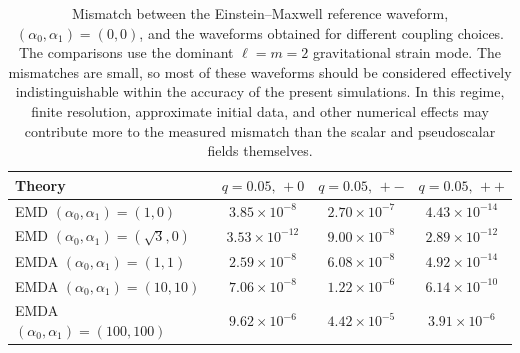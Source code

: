 \begin{table}[htbp]
\centering
\caption[EMDA interpolated mismatch table]{Mismatch between the Einstein--Maxwell reference waveform, $(\alpha_0,\alpha_1)=(0,0)$, and the waveforms obtained for different coupling choices. The comparisons use the dominant $\ell=m=2$ gravitational strain mode. The mismatches are small, so most of these waveforms should be considered effectively indistinguishable within the accuracy of the present simulations. In this regime, finite resolution, approximate initial data, and other numerical effects may contribute more to the measured mismatch than the scalar and pseudoscalar fields themselves.}
\label{tab:emda_coupling_mismatches}

\begin{tabular}{lccc}
\hline
Theory & $q=0.05,\,+0$ & $q=0.05,\,+-$ & $q=0.05,\,++$ \\
\hline
EMD $(\alpha_0,\alpha_1)=(1,0)$
& $3.85\times 10^{-8}$
& $2.70\times 10^{-7}$
& $4.43\times 10^{-14}$ \\
EMD $(\alpha_0,\alpha_1)=(\sqrt{3},0)$
& $3.53\times 10^{-12}$
& $9.00\times 10^{-8}$
& $2.89\times 10^{-12}$ \\
EMDA $(\alpha_0,\alpha_1)=(1,1)$
& $2.59\times 10^{-8}$
& $6.08\times 10^{-8}$
& $4.92\times 10^{-14}$ \\
EMDA $(\alpha_0,\alpha_1)=(10,10)$
& $7.06\times 10^{-8}$
& $1.22\times 10^{-6}$
& $6.14\times 10^{-10}$ \\
EMDA $(\alpha_0,\alpha_1)=(100,100)$
& $9.62\times 10^{-6}$
& $4.42\times 10^{-5}$
& $3.91\times 10^{-6}$ \\
\hline
\end{tabular}
\end{table}